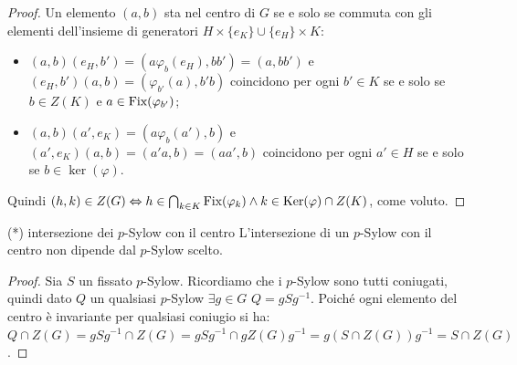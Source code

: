 \begin{proof}
    Un elemento $(a, b)$ sta nel centro di $G$ se e solo se commuta con gli elementi dell'insieme di generatori $H \times \{e_K\} \cup \{e_H\} \times K$:
    \begin{itemize}
        \item $(a, b)(e_H, b') = (a \varphi_b(e_H), b b') = (a, b b')$ e $(e_H, b')(a, b) = (\varphi_{b'}(a), b' b)$ coincidono per ogni $b' \in K$ se e solo se $b \in Z(K)$ e $a \in \text{Fix}(\varphi_{b'})$;
        \item $(a, b)(a', e_K) = (a \varphi_b(a'), b)$ e $(a', e_K)(a, b) = (a' a, b) = (a a', b)$ coincidono per ogni $a' \in H$ se e solo se $b \in \ker(\varphi)$.
    \end{itemize}
    Quindi $(h,k) \in Z(G) \Leftrightarrow h \in \bigcap_{k \in K} \text{Fix}(\varphi_k) \land k \in \text{Ker}(\varphi) \cap Z(K)$, come voluto.
\end{proof}
\begin{proposition}{(*) intersezione dei $p$-Sylow con il centro}
    L'intersezione di un $p$-Sylow con il centro non dipende dal $p$-Sylow scelto.
\end{proposition}
\begin{proof}
    Sia $S$ un fissato $p$-Sylow. Ricordiamo che i $p$-Sylow sono tutti coniugati, quindi dato $Q$ un qualsiasi $p$-Sylow $\exists g \in G$ $Q = gSg^{-1}$. Poiché ogni elemento del centro è invariante per qualsiasi coniugio si ha: $Q \cap Z(G) = gSg^{-1} \cap Z(G) = gSg^{-1} \cap gZ(G)g^{-1} = g(S \cap Z(G))g^{-1} = S \cap Z(G)$. 
\end{proof} 

